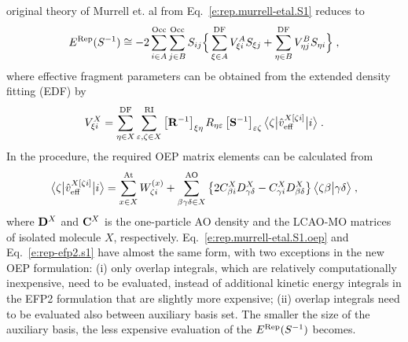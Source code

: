 original theory of Murrell et. al from Eq.~\eqref{e:rep.murrell-etal.S1}
reduces to
%
\begin{equation} \label{e:rep.murrell-etal.S1.oep}
    E^{\rm Rep}(S^{-1}) \cong 
 -2\sum_{i\in A}^{\rm Occ} \sum_{j\in B}^{\rm Occ}
               S_{ij} \Big\{
           \sum_{\xi \in A}^{\rm DF} V_{\xi i}^A S_{\xi j}
         + \sum_{\eta\in B}^{\rm DF} V_{\eta j}^B S_{\eta i}
                \Big\} \;,
\end{equation}
%
where 
effective fragment parameters
can be obtained 
from the extended density fitting\cite{Blasiak.Bednarska.Choluj.Bartkowiak.JCP.2019} (EDF)
by
%
\begin{equation} \label{e:rep.murrell-etal.S1.oep-edf}
            V_{\xi i}^X = \sum_{\eta\in X}^{\rm DF} 
                          \sum_{\varepsilon,\zeta\in X}^{\rm RI}
                          \left[ {\bf R}^{-1} \right]_{\xi\eta} R_{\eta\varepsilon} 
                          \left[ {\bf S}^{-1} \right]_{\varepsilon\zeta} 
                          \bigl\langle {\zeta} \bigl\lvert {\hat{v}_{\rm eff}^{X[\zeta i]}} \bigl\lvert {i} \bigr\rangle
                \;.
\end{equation}
%
In the procedure, the required OEP matrix elements can be calculated from
%
\begin{equation} \label{e:rep.murrell-etal.S1.oep-v}
   \bigl\langle {\zeta} \bigl\lvert {\hat{v}_{\rm eff}^{X[\zeta i]}} \bigl\lvert {i} \bigr\rangle
     = \sum_{x\in X}^{\rm At} W_{\zeta i}^{(x)} 
        + \sum_{\beta\gamma\delta\in X}^{\rm AO}
           \left\{ 
             2 C_{\beta i}^X D_{\gamma\delta}^X - C_{\gamma i}^X D_{\beta \delta}^X
           \right\}
           \bigl\langle {\zeta\beta} \bigl\lvert {\gamma\delta} \bigr\rangle \;,
\end{equation}
%
where ${\bf D}^X$ and ${\bf C}^X$ is the one\hyp{}particle AO density and
the LCAO\hyp{}MO matrices of isolated molecule $X$, respectively.
%
Eq.~\eqref{e:rep.murrell-etal.S1.oep} and Eq.~\eqref{e:rep-efp2.s1} have almost
the same form, with two exceptions in the new OEP formulation: 
(i) only overlap integrals, which are relatively computationally inexpensive,
need to be evaluated, instead of additional kinetic energy integrals in the EFP2
formulation that are slightly more expensive;
(ii) overlap integrals need to be evaluated also between
auxiliary basis set. The smaller the size of the auxiliary basis, the less expensive
evaluation of the $E^{\rm Rep}(S^{-1})$ becomes. 

